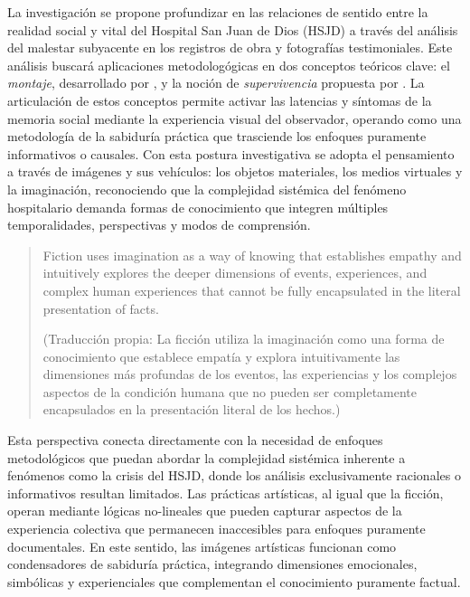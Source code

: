 La investigación se propone profundizar en las relaciones de sentido entre la realidad social y vital del Hospital San Juan de Dios (HSJD) a través del análisis del malestar subyacente en los registros de obra y fotografías testimoniales. Este análisis buscará aplicaciones metodologógicas en dos conceptos teóricos clave: el \textit{montaje}, desarrollado por \parencite{Benjamin2004}, y la noción de \textit{supervivencia} propuesta por \parencite{Warburg2010}. La articulación de estos conceptos permite activar las latencias y síntomas de la memoria social mediante la experiencia visual del observador, operando como una metodología de la sabiduría práctica que trasciende los enfoques puramente informativos o causales. Con esta postura investigativa se adopta el pensamiento a través de imágenes y sus vehículos: los objetos materiales, los medios virtuales y la imaginación, reconociendo que la complejidad sistémica del fenómeno hospitalario demanda formas de conocimiento que integren múltiples temporalidades, perspectivas y modos de comprensión.

\begin{quote}
    Fiction uses imagination as a way of knowing that establishes empathy and intuitively explores the deeper dimensions of events, experiences, and complex human experiences that cannot be fully encapsulated in the literal presentation of facts. \parencite[p. 30]{Leavy2018}
    
    \footnotesize
    (Traducción propia: La ficción utiliza la imaginación como una forma de conocimiento que establece empatía y explora intuitivamente las dimensiones más profundas de los eventos, las experiencias y los complejos aspectos de la condición humana que no pueden ser completamente encapsulados en la presentación literal de los hechos.)
    \normalsize
\end{quote}

Esta perspectiva conecta directamente con la necesidad de enfoques metodológicos que puedan abordar la complejidad sistémica inherente a fenómenos como la crisis del HSJD, donde los análisis exclusivamente racionales o informativos resultan limitados. Las prácticas artísticas, al igual que la ficción, operan mediante lógicas no-lineales que pueden capturar aspectos de la experiencia colectiva que permanecen inaccesibles para enfoques puramente documentales. En este sentido, las imágenes artísticas funcionan como condensadores de sabiduría práctica, integrando dimensiones emocionales, simbólicas y experienciales que complementan el conocimiento puramente factual.

